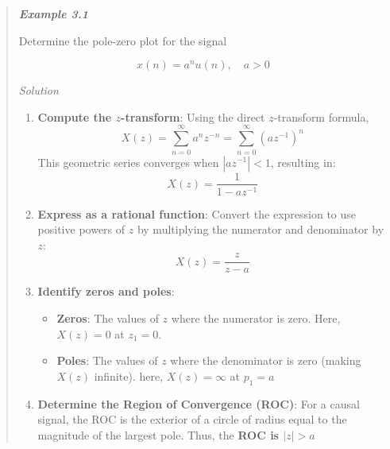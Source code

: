 \begin{quote}
\textbf{\emph{Example 3.1}}

Determine the pole-zero plot for the signal

\[
x(n) = a^n u(n), \quad a > 0
\]

\emph{Solution}

\begin{enumerate}
\def\labelenumi{\arabic{enumi}.}
\tightlist
\item
  \textbf{Compute the \(z\)-transform}: Using the direct \(z\)-transform
  formula,
  \[X(z) = \sum_{n=0}^{\infty} a^n z^{-n} = \sum_{n=0}^{\infty} (az^{-1})^n\]
  This geometric series converges when \(|az^{-1}| < 1\), resulting in:
  \[X(z) = \frac{1}{1 - az^{-1}}\]
\item
  \textbf{Express as a rational function}: Convert the expression to use
  positive powers of \(z\) by multiplying the numerator and denominator
  by \(z\): \[X(z) = \frac{z}{z - a}\]
\item
  \textbf{Identify zeros and poles}:

  \begin{itemize}
  \tightlist
  \item
    \textbf{Zeros}: The values of \(z\) where the numerator is zero.
    Here, \(X(z) = 0\) at \textbf{\(z_1 = 0\)}.
  \item
    \textbf{Poles}: The values of \(z\) where the denominator is zero
    (making \(X(z)\) infinite). here, \(X(z) = \infty\) at
    \textbf{\(p_1 = a\)}
  \end{itemize}
\item
  \textbf{Determine the Region of Convergence (ROC)}: For a causal
  signal, the ROC is the exterior of a circle of radius equal to the
  magnitude of the largest pole. Thus, the \textbf{ROC is \(|z| > a\)}
\end{enumerate}
\end{quote}


